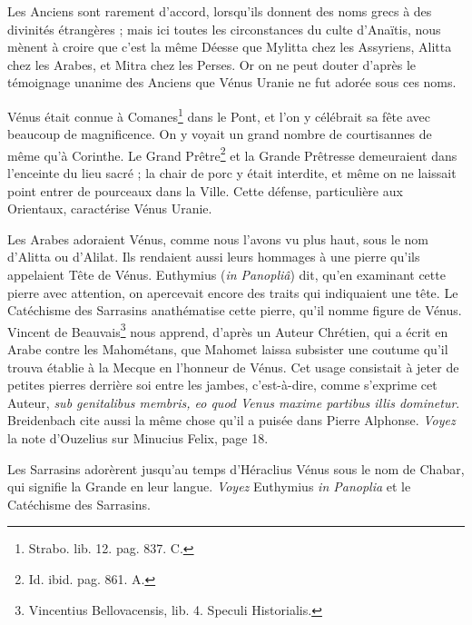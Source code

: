 \documentclass[a4paper, 18pt, oneside]{article}
\begin{document}
Les Anciens sont rarement d'accord, lorsqu'ils donnent des noms grecs à des divinités étrangères ; mais ici toutes les circonstances du culte d'Anaïtis, nous mènent à croire que c'est la même Déesse que Mylitta chez les Assyriens, Alitta chez les Arabes, et Mitra chez les Perses. Or on ne peut douter d'après le témoignage unanime des Anciens que Vénus Uranie ne fut adorée sous ces noms.

Vénus était connue à Comanes\footnote{Strabo. lib. 12. pag. 837. C.} dans le Pont, et l'on y célébrait sa fête avec beaucoup de magnificence. On y voyait un grand nombre de courtisannes de même qu'à Corinthe. Le Grand Prêtre\footnote{Id. ibid. pag. 861. A.} et la Grande Prêtresse demeuraient dans l'enceinte du lieu sacré ; la chair de porc y était interdite, et même on ne laissait point entrer de pourceaux dans la Ville. Cette défense, particulière aux Orientaux, caractérise Vénus Uranie.

Les Arabes adoraient Vénus, comme nous l'avons vu plus haut, sous le nom d'Alitta ou d'Alilat. Ils rendaient aussi leurs hommages à une pierre qu'ils appelaient Tête de Vénus. Euthymius (\emph{in Panopliâ}) dit, qu'en examinant cette pierre avec attention, on apercevait encore des traits qui indiquaient une tête. Le Catéchisme des Sarrasins anathématise cette pierre, qu'il nomme figure de Vénus. Vincent de Beauvais\footnote{Vincentius Bellovacensis, lib. 4. Speculi Historialis.} nous apprend, d'après un Auteur Chrétien, qui a écrit en Arabe contre les Mahométans, que Mahomet laissa subsister une coutume qu'il trouva établie à la Mecque en l'honneur de Vénus. Cet usage consistait à jeter de petites pierres derrière soi entre les jambes, c'est-à-dire, comme s'exprime cet Auteur, \emph{sub genitalibus membris, eo quod Venus maxime partibus illis dominetur}. Breidenbach cite aussi la même chose qu'il a puisée dans Pierre Alphonse. \emph{Voyez} la note d'Ouzelius sur Minucius Felix, page 18.

Les Sarrasins adorèrent jusqu'au temps d'Héraclius Vénus sous le nom de Chabar, qui signifie la Grande en leur langue. \emph{Voyez} Euthymius \emph{in Panoplia} et le Catéchisme des Sarrasins.
\end{document}
